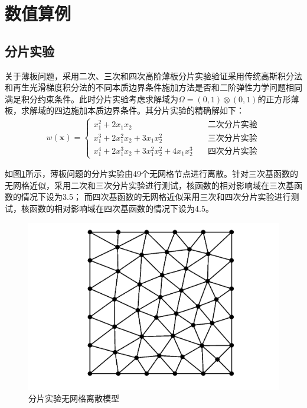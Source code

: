 \section{数值算例}
\subsection{分片实验}
关于薄板问题，采用二次、三次和四次高阶薄板分片实验验证采用传统高斯积分法和再生光滑梯度积分法的不同本质边界条件施加方法是否和二阶弹性力学问题相同
满足积分约束条件。此时分片实验考虑求解域为$\Omega=(0,1)\otimes(0,1)$的正方形薄板，求解域的四边施加本质边界条件。其分片实验的精确解如下：
\begin{equation}
\begin{split}
    w(\pmb{x})=\begin{cases}
        x_1^2+2x_1x_2\quad &\text{二次分片实验}\\
        x_1^3+2x_1^2x_2+3x_1x_2^2\quad &\text{三次分片实验}\\
        x_1^4+2x_1^3x_2+3x_1^2x_2^2+4x_1x_2^3\quad&\text{四次分片实验}
    \end{cases}
\end{split}
\end{equation}\par
如图\ref{fenpian}所示，薄板问题的分片实验由49个无网格节点进行离散。针对三次基函数的无网格近似，采用二次和三次分片实验进行测试，核函数的相对影响域在三次基函数的情况下设为3.5；
而四次基函数的无网格近似采用三次和四次分片实验进行测试，核函数的相对影响域在四次基函数的情况下设为4.5。\par
\begin{figure}[H]
    \centering
    \includegraphics[scale=0.7]{figure/PHR/fenpian.png}
    \caption{分片实验无网格离散模型}\label{fenpian}
\end{figure}
